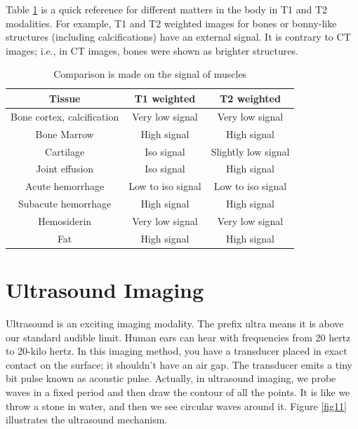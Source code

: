 Table \ref{tab2} is a quick reference for different matters in the body in T1 and T2 modalities. For example, T1 and T2 weighted images for bones or bonny-like structures (including calcifications) have an external signal. It is contrary to CT images; i.e., in CT images, bones were shown as brighter structures.

\begin{table}[htbp]
	\centering
	\caption{Comparison is made on the signal of muscles }
	\label{tab2}
	\renewcommand{\arraystretch}{1.2}
	\begin{tabular}{|c|c|c|}
		\hline
		\textbf{Tissue}            & \textbf{T1 weighted} & \textbf{T2 weighted} \\ \hline
		Bone cortex, calcification & Very low signal      & Very low signal      \\ \hline
		Bone Marrow                & High signal          & High signal          \\ \hline
		Cartilage                  & Iso signal           & Slightly low signal  \\ \hline
		Joint effusion             & Iso signal           & High signal          \\ \hline
		Acute hemorrhage           & Low to iso signal    & Low to iso signal    \\ \hline
		Subacute hemorrhage        & High signal          & High signal          \\ \hline
		Hemosiderin                & Very low signal      & Very low signal      \\ \hline
		Fat                        & High signal          & High signal          \\ \hline
	\end{tabular}
\end{table}


\section{Ultrasound Imaging}

Ultrasound is an exciting imaging modality. The prefix ultra means it is above our standard audible limit. Human ears can hear with frequencies from 20 hertz to 20-kilo hertz. In this imaging method, you have a transducer placed in exact contact on the surface; it shouldn’t have an air gap. The transducer emits a tiny bit pulse known as acoustic pulse. Actually, in ultrasound imaging, we probe waves in a fixed period and then draw the contour of all the points. It is like we throw a stone in water, and then we see circular waves around it. Figure \ref{fig11} illustrates the ultrasound mechanism.

